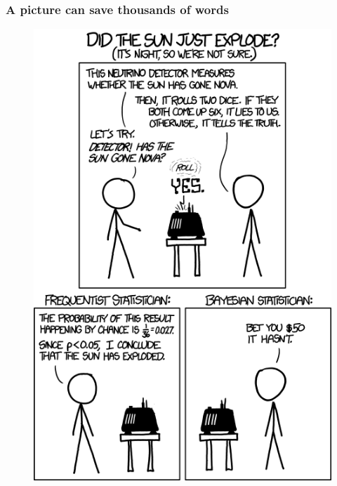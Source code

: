 \documentclass{beamer}
\begin{document}
 \begin{frame}
  \frametitle{\bf A picture can save thousands of words}
  
  \begin{figure}
   \includegraphics[width=\textwidth,height=.8\textheight,keepaspectratio]{frequentists_vs_bayesians.png}
  \end{figure}  
  
 \end{frame}

 
\end{document}
